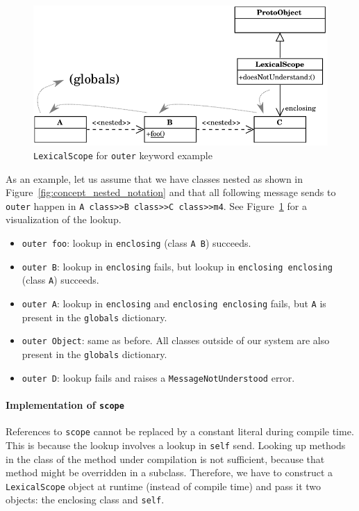 \begin{figure}[!htp]
	\includegraphics[scale=1]{lexical_outer.pdf}
	\centering
	\caption{\texttt{LexicalScope} for \texttt{outer} keyword example}
	\label{impl:lex_outer}
\end{figure}

As an example, let us assume that we have classes nested as shown in Figure~\ref{fig:concept_nested_notation} and that all following message sends to \texttt{outer} happen in \texttt{A class>>B class>>C class>>m4}. See Figure~\ref{impl:lex_outer} for a visualization of the lookup.
\begin{itemize}
	\item \texttt{outer foo}: lookup in \texttt{enclosing} (class \texttt{A B}) succeeds.
	\item \texttt{outer B}: lookup in \texttt{enclosing} fails, but lookup in \texttt{enclosing enclosing} (class \texttt{A}) succeeds.
	\item \texttt{outer A}: lookup in \texttt{enclosing} and \texttt{enclosing enclosing} fails, but \texttt{A} is present in the \texttt{globals} dictionary.
	\item \texttt{outer Object}: same as before. All classes outside of our system are also present in the \texttt{globals} dictionary.
	\item \texttt{outer D}: lookup fails and raises a \texttt{MessageNotUnderstood} error.
\end{itemize}

\paragraph{Implementation of \texttt{scope}}
References to \texttt{scope} cannot be replaced by a constant literal during compile time. This is because the lookup involves a lookup in \texttt{self} send. Looking up methods in the class of the method under compilation is not sufficient, because that method might be overridden in a subclass. Therefore, we have to construct a \texttt{LexicalScope} object at runtime (instead of compile time) and pass it two objects: the enclosing class and \texttt{self}.


